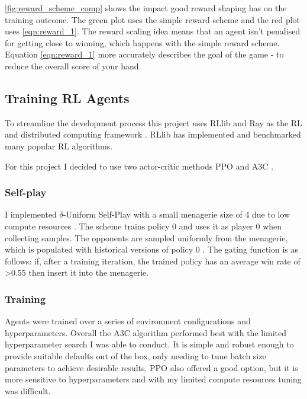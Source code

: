 \documentclass[../main.tex]{subfiles}
\begin{document}
\autoref{fig:reward_scheme_comp} shows the impact good reward shaping has on the training outcome. The green plot uses the simple reward scheme and the red plot uses \eqref{eqn:reward_1}. The reward scaling idea means that an agent isn't penalised for getting close to winning, which happens with the simple reward scheme. Equation \eqref{eqn:reward_1} more accurately describes the goal of the game - to reduce the overall score of your hand. 

\subsection{Training RL Agents}
To streamline the development process this project uses RLlib and Ray as the RL and distributed computing framework \cite{liang_rllib_2018}. RLlib has implemented and benchmarked many popular RL algorithms.


For this project I decided to use two actor-critic methods PPO \cite{schulman_proximal_2017} and A3C \cite{mnih_asynchronous_2016}. 

\subsubsection{Self-play} \label{method:selfplay}

I implemented $\delta$-Uniform Self-Play with a small menagerie size of 4 due to low compute resources \cite{hernandez_comparison_2020}. The scheme trains policy 0 and uses it as player 0 when collecting samples. The opponents are sampled uniformly from the menagerie, which is populated with historical versions of policy 0 \cite{bansal_emergent_2018}. The gating function is as follows: if, after a training iteration, the trained policy has an average win rate of >0.55 then insert it into the menagerie. 


\subsubsection{Training}
Agents were trained over a series of environment configurations and hyperparameters. Overall the A3C algorithm performed best with the limited hyperparameter search I was able to conduct. It is simple and robust enough to provide suitable defaults out of the box, only needing to tune batch size parameters to achieve desirable results. PPO also offered a good option, but it is more sensitive to hyperparameters and with my limited compute resources tuning was difficult. 
\end{document}

